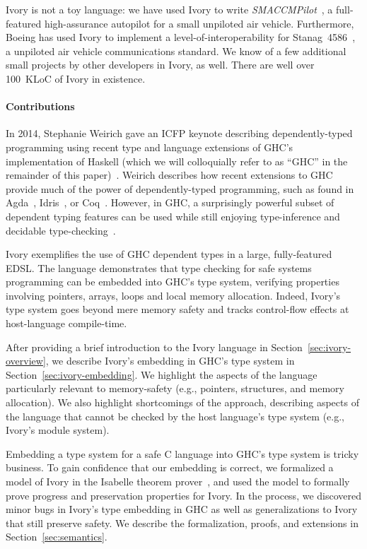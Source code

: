 
Ivory is not a toy language: we have used Ivory to write
\emph{SMACCMPilot}~\cite{smaccm}, a full-featured high-assurance
autopilot for a small unpiloted air vehicle.  Furthermore, Boeing has
used Ivory to implement a level-of-interoperability for
Stanag~4586~\cite{stanag}, a unpiloted air vehicle communications
standard. We know of a few additional small projects by other
developers in Ivory, as well.  There are well over 100~KLoC of Ivory in existence.

\paragraph{Contributions}
In 2014, Stephanie Weirich gave an ICFP keynote describing dependently-typed programming
using recent type and language extensions of GHC's implementation of Haskell
(which we will colloquially refer to as ``GHC'' in the remainder of this
paper)~\cite{weirich-keynote}. Weirich describes how recent extensions to GHC
provide much of the power of dependently-typed programming, such as found in
Agda~\cite{agda}, Idris~\cite{idris}, or Coq~\cite{coq}. However, in GHC, a
surprisingly powerful subset of dependent typing features can be used while
still enjoying type-inference and decidable type-checking~\cite{dephaskell}.

Ivory exemplifies the use of GHC dependent types in a large, fully-featured
EDSL. The language demonstrates that type checking for safe systems programming
can be embedded into GHC's type system, verifying properties involving
pointers, arrays, loops and local memory allocation. Indeed, Ivory's type
system goes beyond mere memory safety and tracks control-flow effects at host-language
compile-time.

After providing a brief introduction to the Ivory language in
Section~\ref{sec:ivory-overview}, we describe Ivory's embedding in GHC's type
system in Section~\ref{sec:ivory-embedding}. We highlight the aspects of the
language particularly relevant to memory-safety (e.g., pointers, structures, and
memory allocation). We also highlight shortcomings of the approach, describing
aspects of the language that cannot be checked by the host language's type
system (e.g., Ivory's module system).

Embedding a type system for a safe C language into GHC's type system is tricky
business. To gain confidence that our embedding is correct, we formalized a
model of Ivory in the Isabelle theorem prover~\cite{isabelle}, and used the model to
formally prove progress and preservation properties for Ivory. In the process,
we discovered minor bugs in Ivory's type embedding in GHC as well as
generalizations to Ivory that still preserve safety. We describe the
formalization, proofs, and extensions in Section~\ref{sec:semantics}.

